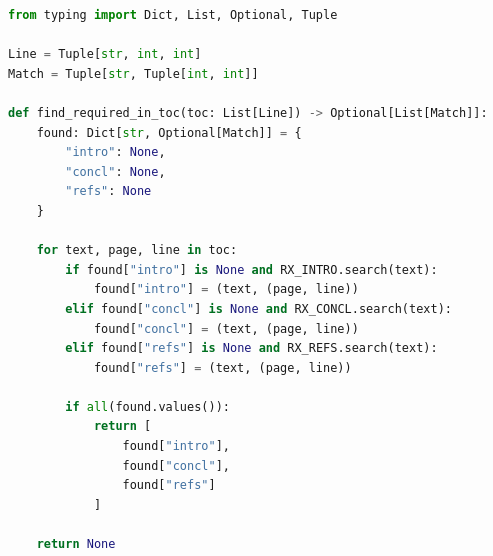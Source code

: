 \begin{lstlisting}[language=Python,label={lst:qwen_core},
caption={Оптимизация досрочного завершения проверки (модель Qwen)}]
from typing import Dict, List, Optional, Tuple

Line = Tuple[str, int, int]
Match = Tuple[str, Tuple[int, int]]

def find_required_in_toc(toc: List[Line]) -> Optional[List[Match]]:
    found: Dict[str, Optional[Match]] = {
        "intro": None,
        "concl": None,
        "refs": None
    }

    for text, page, line in toc:
        if found["intro"] is None and RX_INTRO.search(text):
            found["intro"] = (text, (page, line))
        elif found["concl"] is None and RX_CONCL.search(text):
            found["concl"] = (text, (page, line))
        elif found["refs"] is None and RX_REFS.search(text):
            found["refs"] = (text, (page, line))

        if all(found.values()):
            return [
                found["intro"],
                found["concl"],
                found["refs"]
            ]

    return None
\end{lstlisting}

\clearpage
